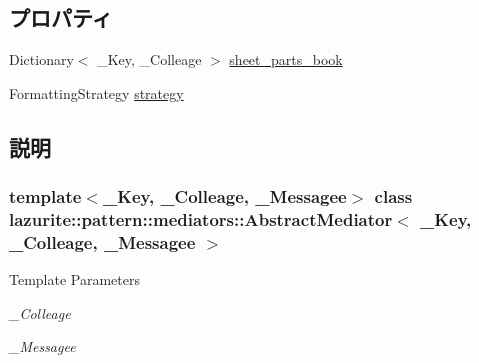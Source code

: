 \subsection*{プロパティ}
\begin{DoxyCompactItemize}
\item 
Dictionary$<$ \_\-Key, \_\-Colleage $>$ \hyperlink{classlazurite_1_1pattern_1_1mediators_1_1_abstract_mediator_3_01___key_00_01___colleage_00_01___messagee_01_4_acd05162b89cdf5daa2cf8b82b0e9ae73}{sheet\_\-parts\_\-book}
\item 
FormattingStrategy \hyperlink{classlazurite_1_1pattern_1_1mediators_1_1_abstract_mediator_3_01___key_00_01___colleage_00_01___messagee_01_4_a8106939ab4566b09e7032356d48eadff}{strategy}
\end{DoxyCompactItemize}


\subsection{説明}
\subsubsection*{template$<$\_\-Key, \_\-Colleage, \_\-Messagee$>$ class lazurite::pattern::mediators::AbstractMediator$<$ \_\-Key, \_\-Colleage, \_\-Messagee $>$}


\begin{DoxyTemplParams}{Template Parameters}
\item[{\em \_\-Colleage}]\item[{\em \_\-Messagee}]\end{DoxyTemplParams}


